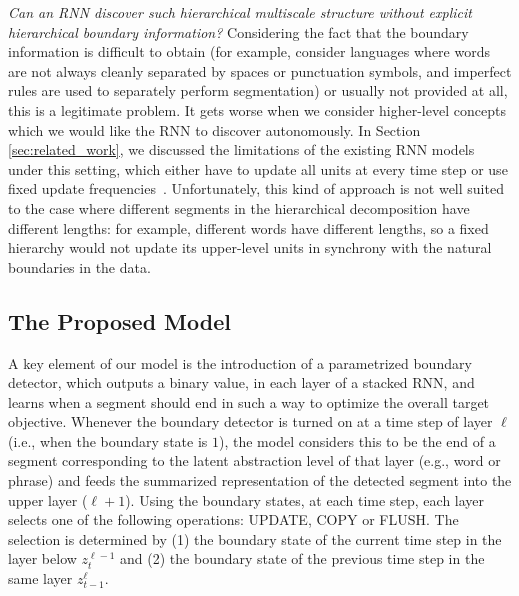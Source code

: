 \documentclass{article} %
\begin{document}
\textit{Can an RNN discover such hierarchical multiscale structure
        without explicit hierarchical boundary information?} 
Considering the fact that the boundary information is difficult to obtain
(for example, consider languages where words are not always cleanly separated
by spaces or punctuation symbols,
and imperfect rules are used to separately perform segmentation)
or usually not provided at all, this is a legitimate problem. It gets worse when
we consider higher-level concepts which we would like the RNN to discover
autonomously. In Section
\ref{sec:related_work}, we discussed the limitations of the existing RNN models
under this setting, which either have to update all units at every time step
or use fixed update frequencies~\citep{el1995hierarchical,koutnik2014clockwork}.
Unfortunately,  this kind of approach is not well suited to the case where different segments in the hierarchical decomposition
have different lengths: for example, different words have different lengths, so a fixed hierarchy
would not update its upper-level units in synchrony with the natural boundaries in the data.

\subsection{The Proposed Model}
\label{sec:proposed}

A key element of our model is the introduction of a parametrized boundary detector, 
which outputs a binary value, in each layer of a stacked RNN, and learns 
when a segment should end in such a way to optimize the overall target objective.
Whenever the boundary detector is turned on at a time step of layer $\ell$ (i.e., when the boundary state is $1$), 
the model considers this to be the end of a segment corresponding to the latent abstraction level of that layer (e.g., word or phrase)
and feeds the summarized representation of the detected segment into the upper layer ($\ell + 1$).
Using the boundary states, at each time step, each layer selects one of the following operations: UPDATE, COPY or FLUSH. 
The selection is determined by (1) the boundary state of the current time step in the layer below $z_t^{\ell-1}$ and 
(2) the boundary state of the previous time step in the same layer $z_{t-1}^\ell$. 
\end{document}
